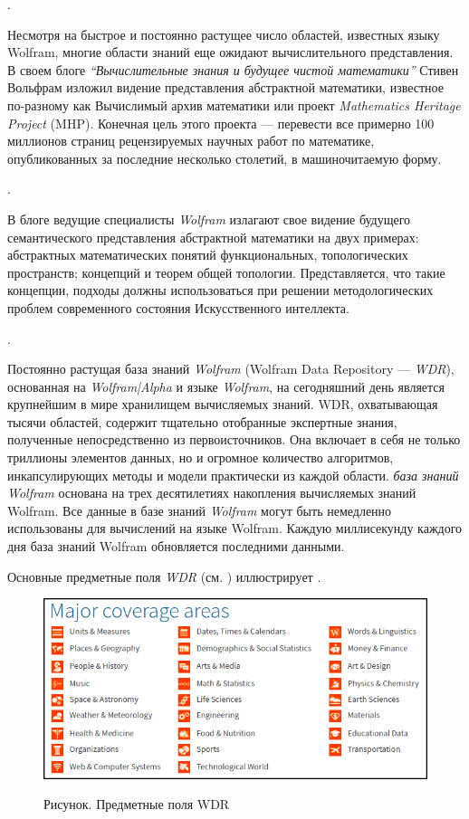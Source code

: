 . 

Несмотря на быстрое и постоянно растущее число областей, известных языку Wolfram, многие области знаний еще ожидают вычислительного представления. В своем блоге \textit{``Вычислительные знания и будущее чистой математики''} Стивен Вольфрам изложил видение представления абстрактной математики, известное по-разному как Вычислимый архив математики или проект \textit{Mathematics Heritage Project} (MHP). Конечная цель этого проекта --- перевести все примерно 100 миллионов страниц рецензируемых научных работ по математике, опубликованных за последние несколько столетий, в машиночитаемую форму.

. 

В блоге  ведущие специалисты \textit{Wolfram} излагают свое видение будущего семантического представления абстрактной математики на двух примерах: абстрактных математических понятий функциональных, топологических пространств; концепций и теорем общей топологии. 
Представляется, что такие концепции, подходы должны использоваться при решении методологических проблем современного состояния Искусственного интеллекта. 

. 

Постоянно растущая база знаний \textit{Wolfram} (Wolfram
Data Repository --- \textit{WDR}), основанная на \textit{Wolfram|Alpha} и языке \textit{Wolfram}, на сегодняшний день является крупнейшим в мире хранилищем вычисляемых знаний. 
WDR, охватывающая тысячи областей, содержит тщательно отобранные экспертные знания, полученные непосредственно из первоисточников. 
Она включает в себя не только триллионы элементов данных, но и огромное количество алгоритмов, инкапсулирующих методы и модели практически из каждой области.
\textit{база знаний} \textit{Wolfram} основана на трех десятилетиях накопления вычисляемых знаний Wolfram. Все данные в базе знаний \textit{Wolfram} могут быть немедленно использованы для вычислений на языке Wolfram. Каждую миллисекунду каждого дня база знаний Wolfram обновляется последними данными. 

Основные предметные поля \textit{WDR} (см. ) иллюстрирует \textit{}.

\begin{figure}[H]
	\caption{Рисунок. Предметные поля WDR}
	\includegraphics[scale=0.9]{images/part7/chapter_integration/integr_alg1.png}
	\label{fig:integr_alg1}
\end{figure}

